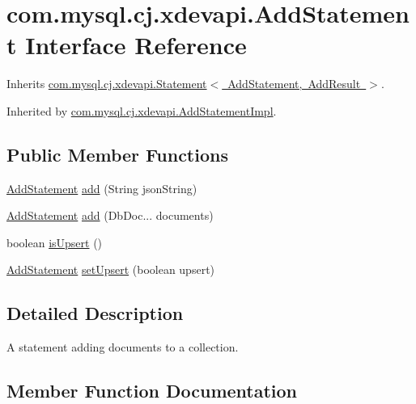 \hypertarget{interfacecom_1_1mysql_1_1cj_1_1xdevapi_1_1_add_statement}{}\section{com.\+mysql.\+cj.\+xdevapi.\+Add\+Statement Interface Reference}
\label{interfacecom_1_1mysql_1_1cj_1_1xdevapi_1_1_add_statement}


Inherits \mbox{\hyperlink{interfacecom_1_1mysql_1_1cj_1_1xdevapi_1_1_statement}{com.\+mysql.\+cj.\+xdevapi.\+Statement$<$ Add\+Statement, Add\+Result $>$}}.



Inherited by \mbox{\hyperlink{classcom_1_1mysql_1_1cj_1_1xdevapi_1_1_add_statement_impl}{com.\+mysql.\+cj.\+xdevapi.\+Add\+Statement\+Impl}}.

\subsection*{Public Member Functions}
\begin{DoxyCompactItemize}
\item 
\mbox{\hyperlink{interfacecom_1_1mysql_1_1cj_1_1xdevapi_1_1_add_statement}{Add\+Statement}} \mbox{\hyperlink{interfacecom_1_1mysql_1_1cj_1_1xdevapi_1_1_add_statement_a74f363f3bc32c51f83c4ae69722b179c}{add}} (String json\+String)
\item 
\mbox{\hyperlink{interfacecom_1_1mysql_1_1cj_1_1xdevapi_1_1_add_statement}{Add\+Statement}} \mbox{\hyperlink{interfacecom_1_1mysql_1_1cj_1_1xdevapi_1_1_add_statement_a886e1294099cf00085c882aba48bf06e}{add}} (Db\+Doc... documents)
\item 
boolean \mbox{\hyperlink{interfacecom_1_1mysql_1_1cj_1_1xdevapi_1_1_add_statement_a22f74388f89be049d0f1c591e143874c}{is\+Upsert}} ()
\item 
\mbox{\hyperlink{interfacecom_1_1mysql_1_1cj_1_1xdevapi_1_1_add_statement}{Add\+Statement}} \mbox{\hyperlink{interfacecom_1_1mysql_1_1cj_1_1xdevapi_1_1_add_statement_ab2681842a71332f6170cb5b227ff6ebd}{set\+Upsert}} (boolean upsert)
\end{DoxyCompactItemize}


\subsection{Detailed Description}
A statement adding documents to a collection. 

\subsection{Member Function Documentation}
\mbox{\label{interfacecom_1_1mysql_1_1cj_1_1xdevapi_1_1_add_statement_a74f363f3bc32c51f83c4ae69722b179c}} 
